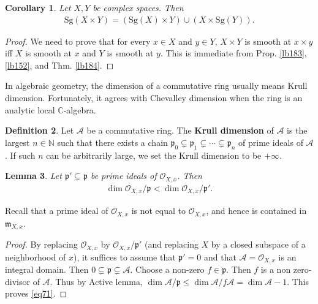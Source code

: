 \documentclass[12pt,b5paper,notitlepage]{report}
\theoremstyle{definition}
\newtheorem{df}{Definition}[section]
\theoremstyle{plain}
\newtheorem{co}[df]{Corollary}
\newtheorem{lm}[df]{Lemma}
\newcommand{\fk}{\mathfrak}
\newcommand{\mc}{\mathcal}
\newcommand{\scr}{\mathscr}
\newcommand{\pk}{\mathfrak p}
\newcommand{\Cbb}{\mathbb C}
\newcommand{\Nbb}{\mathbb N}
\newcommand{\Sg}{\mathrm{Sg}}
\numberwithin{equation}{section}
\begin{document}
\begin{co}\label{lb185}
Let $X,Y$ be complex spaces. Then
\begin{align}
\Sg(X\times Y)=(\Sg(X)\times Y)\cup(X\times\Sg(Y)).
\end{align}
\end{co}
\begin{proof}
We need to prove that for every $x\in X$ and $y\in Y$, $X\times Y$ is smooth at $x\times y$ iff $X$ is smooth at $x$ and $Y$ is smooth at $y$. This is immediate from Prop. \ref{lb183}, \ref{lb152}, and Thm. \ref{lb184}.
\end{proof}









In algebraic geometry, the dimension of a commutative ring usually means Krull dimension. Fortunately, it agrees with Chevalley dimension when the ring is an analytic local $\Cbb$-algebra.

\begin{df}
Let $\mc A$ be a commutative ring. The \textbf{Krull dimension} of $\mc A$ is the largest $n\in\Nbb$ such that there exists a chain $\pk_0\subsetneq\pk_1\subsetneq\cdots\subsetneq \pk_n$ of prime ideals of $\mc A$. If such $n$ can be arbitrarily large, we set the Krull dimension to be $+\infty$.
\end{df}








\begin{lm}\label{lb150}
Let $\pk'\subsetneq\pk$ be prime ideals of $\scr O_{X,x}$. Then
\begin{align}
\dim\scr O_{X,x}/\pk<\dim\scr O_{X,x}/\pk'. \label{eq71}
\end{align}
\end{lm}
Recall that a prime ideal of $\scr O_{X,x}$ is not equal to $\scr O_{X,x}$, and hence is contained in $\fk m_{X,x}$.

\begin{proof}
By replacing $\scr O_{X,x}$ by $\scr O_{X,x}/\pk'$ (and replacing $X$ by a closed subspace of a neighborhood of $x$), it suffices to assume that $\pk'=0$ and that $\scr A=\scr O_{X,x}$ is an integral domain. Then $0\subsetneq\pk\subsetneq\scr A$. Choose a non-zero $f\in\pk$. Then $f$ is a non zero-divisor of $\scr A$. Thus by Active lemma, $\dim\scr A/\pk\leq \dim\scr A/f\scr A=\dim\scr A-1$. This proves \eqref{eq71}.
\end{proof}
\end{document}
